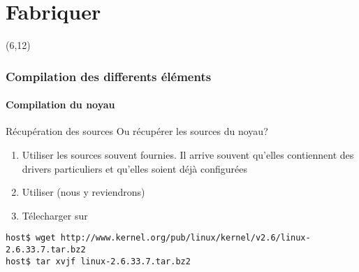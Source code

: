 %
%

\part{Fabriquer}

{
\begin{frame}[plain]
  \partpage
  \begin{textblock}{10}(6,12)
    \begin{quote}
      \rmfamily\textit\textbf\color{darkgray}{\large
        ``Talk is cheap. Show me the code.''}
        \vskip3mm\hspace*{}
    \end{quote}
  \end{textblock}
\end{frame}
}

\begin{frame}
  \partpage
\end{frame}

\begin{frame}
  \tableofcontents
\end{frame}

\section{Compilation des differents éléments}

\subsection{Compilation du noyau}

\begin{frame}[fragile=singleslide]{Récupération des sources}
  Ou récupérer les sources du noyau?
  \begin{enumerate}
  \item Utiliser  les sources souvent fournies.  Il arrive souvent
    qu'elles  contiennent  des  drivers particuliers  et  qu'elles
    soient déjà configurées
  \item Utiliser  (nous y reviendrons)
  \item Télecharger sur 
  \end{enumerate}
  \begin{lstlisting}
host$ wget http://www.kernel.org/pub/linux/kernel/v2.6/linux-2.6.33.7.tar.bz2
host$ tar xvjf linux-2.6.33.7.tar.bz2
  \end{lstlisting}
\end{frame}

